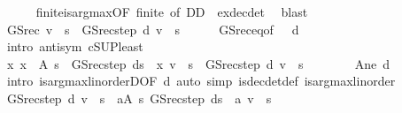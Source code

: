 \begin{isabellebody}
\ \ \ \ \isamarkupfalse%
\ finite{\isacharunderscore}{\kern0pt}is{\isacharunderscore}{\kern0pt}arg{\isacharunderscore}{\kern0pt}max{\isacharbrackleft}{\kern0pt}OF\ finite{\isacharcomma}{\kern0pt}\ of\ {\isachardoublequoteopen}D\isactrlsub D{\isachardoublequoteclose}\ {\isacharbrackright}{\kern0pt}\ ex{\isacharunderscore}{\kern0pt}dec{\isacharunderscore}{\kern0pt}det\ \isamarkupfalse%
\ blast\isanewline
\ \ \isamarkupfalse%
\ {\isachardoublequoteopen}GS{\isacharunderscore}{\kern0pt}rec\ v\ {\isachardollar}{\kern0pt}\ s\ {\isacharequal}{\kern0pt}\ GS{\isacharunderscore}{\kern0pt}rec{\isacharunderscore}{\kern0pt}step\ d\ v\ {\isachardollar}{\kern0pt}\ s{\isachardoublequoteclose}\isanewline
\ \ \ \ \isamarkupfalse%
\ GS{\isacharunderscore}{\kern0pt}rec{\isacharunderscore}{\kern0pt}eq{\isacharprime}{\kern0pt}{\isacharbrackleft}{\kern0pt}of\ {\isacharunderscore}{\kern0pt}\ {\isacharunderscore}{\kern0pt}\ d{\isacharbrackright}{\kern0pt}\isanewline
\ \ \isamarkupfalse%
\ {\isacharparenleft}{\kern0pt}intro\ antisym\ cSUP{\isacharunderscore}{\kern0pt}least{\isacharparenright}{\kern0pt}\isanewline
\ \ \ \ \isamarkupfalse%
\ {\isachardoublequoteopen}{\isasymAnd}x{\isachardot}{\kern0pt}\ x\ {\isasymin}\ A\ s\ {\isasymLongrightarrow}\ GS{\isacharunderscore}{\kern0pt}rec{\isacharunderscore}{\kern0pt}step\ {\isacharparenleft}{\kern0pt}d{\isacharparenleft}{\kern0pt}s\ {\isacharcolon}{\kern0pt}{\isacharequal}{\kern0pt}\ x{\isacharparenright}{\kern0pt}{\isacharparenright}{\kern0pt}\ v\ {\isachardollar}{\kern0pt}\ s\ {\isasymle}\ GS{\isacharunderscore}{\kern0pt}rec{\isacharunderscore}{\kern0pt}step\ d\ v\ {\isachardollar}{\kern0pt}\ s{\isachardoublequoteclose}\isanewline
\ \ \ \ \ \ \isamarkupfalse%
\ A{\isacharunderscore}{\kern0pt}ne\ d\isanewline
\ \ \ \ \ \ \isamarkupfalse%
\ {\isacharparenleft}{\kern0pt}intro\ is{\isacharunderscore}{\kern0pt}arg{\isacharunderscore}{\kern0pt}max{\isacharunderscore}{\kern0pt}linorderD{\isacharbrackleft}{\kern0pt}OF\ d{\isacharbrackright}{\kern0pt}{\isacharparenright}{\kern0pt}\ {\isacharparenleft}{\kern0pt}auto\ simp{\isacharcolon}{\kern0pt}\ is{\isacharunderscore}{\kern0pt}dec{\isacharunderscore}{\kern0pt}det{\isacharunderscore}{\kern0pt}def\ is{\isacharunderscore}{\kern0pt}arg{\isacharunderscore}{\kern0pt}max{\isacharunderscore}{\kern0pt}linorder{\isacharparenright}{\kern0pt}\isanewline
\ \ \ \ \isamarkupfalse%
\ {\isachardoublequoteopen}GS{\isacharunderscore}{\kern0pt}rec{\isacharunderscore}{\kern0pt}step\ d\ v\ {\isachardollar}{\kern0pt}\ s\ {\isasymle}\ {\isacharparenleft}{\kern0pt}{\isasymSqunion}a{\isasymin}A\ s{\isachardot}{\kern0pt}\ GS{\isacharunderscore}{\kern0pt}rec{\isacharunderscore}{\kern0pt}step\ {\isacharparenleft}{\kern0pt}d{\isacharparenleft}{\kern0pt}s\ {\isacharcolon}{\kern0pt}{\isacharequal}{\kern0pt}\ a{\isacharparenright}{\kern0pt}{\isacharparenright}{\kern0pt}\ v\ {\isachardollar}{\kern0pt}\ s{\isacharparenright}{\kern0pt}{\isachardoublequoteclose}\isanewline

\end{isabellebody}
